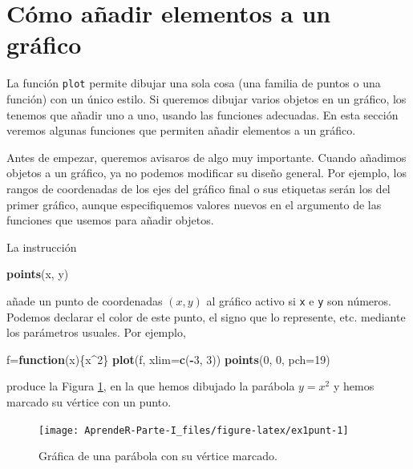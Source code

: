 \documentclass[]{book}
\newenvironment{Shaded}{\begin{snugshade}}{\end{snugshade}}
\newcommand{\ControlFlowTok}[1]{\textcolor[rgb]{0.13,0.29,0.53}{\textbf{#1}}}
\newcommand{\DataTypeTok}[1]{\textcolor[rgb]{0.13,0.29,0.53}{#1}}
\newcommand{\DecValTok}[1]{\textcolor[rgb]{0.00,0.00,0.81}{#1}}
\newcommand{\KeywordTok}[1]{\textcolor[rgb]{0.13,0.29,0.53}{\textbf{#1}}}
\newcommand{\NormalTok}[1]{#1}
\newcommand{\OperatorTok}[1]{\textcolor[rgb]{0.81,0.36,0.00}{\textbf{#1}}}
\theoremstyle{definition}
\theoremstyle{definition}
\theoremstyle{definition}
\theoremstyle{remark}
\begin{document}
\hypertarget{como-anadir-elementos-a-un-grafico}{%
\section{Cómo añadir elementos a un gráfico}\label{como-anadir-elementos-a-un-grafico}}

La función \texttt{plot} permite dibujar una sola cosa (una familia de puntos o una función) con un único estilo. Si queremos dibujar varios objetos en un gráfico, los tenemos que añadir uno a uno, usando las funciones adecuadas. En esta sección veremos algunas funciones que permiten añadir elementos a un gráfico.

Antes de empezar, queremos avisaros de algo muy importante. Cuando añadimos objetos a un gráfico, ya no podemos modificar su diseño general. Por ejemplo, los rangos de coordenadas de los ejes del gráfico final o sus etiquetas serán los del primer gráfico, aunque especifiquemos valores nuevos en el argumento de las funciones que usemos para añadir objetos.

La instrucción

\begin{Shaded}
\begin{Highlighting}[]
\KeywordTok{points}\NormalTok{(x, y)}
\end{Highlighting}
\end{Shaded}

añade un punto de coordenadas \((x, y)\) al gráfico activo si \texttt{x} e \texttt{y} son números. Podemos declarar el color de este punto, el signo que lo represente, etc. mediante los parámetros usuales. Por ejemplo,

\begin{Shaded}
\begin{Highlighting}[]
\NormalTok{f=}\ControlFlowTok{function}\NormalTok{(x)\{x}\OperatorTok{^}\DecValTok{2}\NormalTok{\}}
\KeywordTok{plot}\NormalTok{(f, }\DataTypeTok{xlim=}\KeywordTok{c}\NormalTok{(}\OperatorTok{-}\DecValTok{3}\NormalTok{, }\DecValTok{3}\NormalTok{))}
\KeywordTok{points}\NormalTok{(}\DecValTok{0}\NormalTok{, }\DecValTok{0}\NormalTok{, }\DataTypeTok{pch=}\DecValTok{19}\NormalTok{)}
\end{Highlighting}
\end{Shaded}

produce la Figura \ref{fig:ex1punt}, en la que hemos dibujado la parábola \(y=x^2\) y hemos marcado su vértice con un punto.

\begin{figure}

{\centering \texttt{[image: AprendeR-Parte-I\_files/figure-latex/ex1punt-1]} 

}

\caption{Gráfica de una parábola con su vértice marcado.}\label{fig:ex1punt}
\end{figure}
\end{document}
